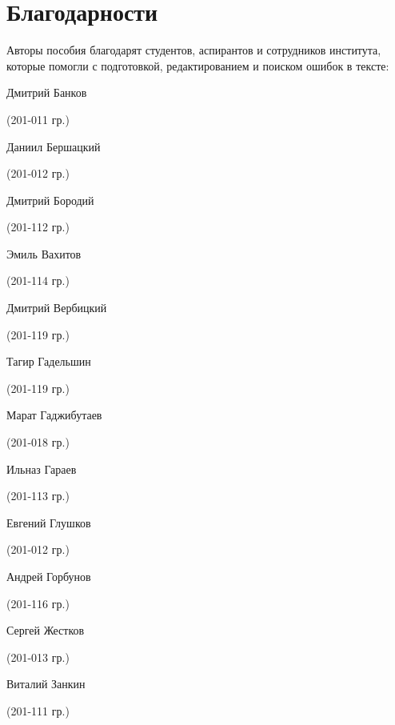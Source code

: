 \section*{Благодарности}
Авторы пособия благодарят студентов, аспирантов и сотрудников института, которые помогли с подготовкой, редактированием и поиском ошибок в тексте:

\begin{multicols}{2}
\begin{small}
\begin{enumerate*}\itemsep1pt \parskip0pt 
	\item Дмитрий Банков\begin{tiny} (201-011 гр.)\end{tiny}
	\item Даниил Бершацкий\begin{tiny} (201-012 гр.)\end{tiny}
	\item Дмитрий Бородий\begin{tiny} (201-112 гр.)\end{tiny}
	\item Эмиль Вахитов\begin{tiny} (201-114 гр.)\end{tiny}
	\item Дмитрий Вербицкий\begin{tiny} (201-119 гр.)\end{tiny}
	\item Тагир Гадельшин\begin{tiny} (201-119 гр.)\end{tiny}
	\item Марат Гаджибутаев\begin{tiny} (201-018 гр.)\end{tiny}
	\item Ильназ Гараев\begin{tiny} (201-113 гр.)\end{tiny}
	\item Евгений Глушков\begin{tiny} (201-012 гр.)\end{tiny}
	\item Андрей Горбунов\begin{tiny} (201-116 гр.)\end{tiny}
	\item Сергей Жестков\begin{tiny} (201-013 гр.)\end{tiny}
        \item Виталий Занкин\begin{tiny} (201-111 гр.)\end{tiny}

\end{enumerate*}
\end{small}
\end{multicols}
